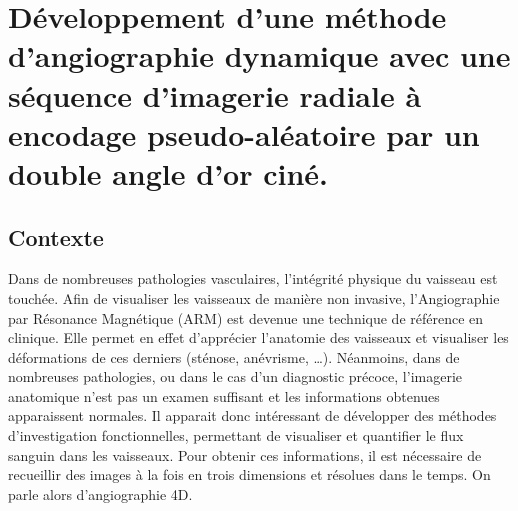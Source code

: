 \chapter{Développement d'une méthode d'angiographie dynamique avec une séquence d'imagerie radiale à encodage pseudo-aléatoire par un double angle d'or ciné.}
\setlength{\footskip}{50pt}

\label{Chap3}
\section{Contexte}

Dans de nombreuses pathologies vasculaires, l’intégrité physique du vaisseau est touchée. Afin de visualiser les vaisseaux de manière non invasive, l’Angiographie par Résonance Magnétique (ARM) est devenue une technique de référence en clinique. Elle permet en effet d’apprécier l’anatomie des vaisseaux et visualiser les déformations de ces derniers (sténose, anévrisme, …). Néanmoins, dans de nombreuses pathologies, ou dans le cas d’un diagnostic précoce, l’imagerie anatomique n’est pas un examen suffisant et les informations obtenues apparaissent normales. Il apparait donc intéressant de développer des méthodes d'investigation fonctionnelles, permettant de visualiser et quantifier le flux sanguin dans les vaisseaux. Pour obtenir ces informations, il est nécessaire de recueillir des images à la fois en trois dimensions et résolues dans le temps. On parle alors d’angiographie 4D.

